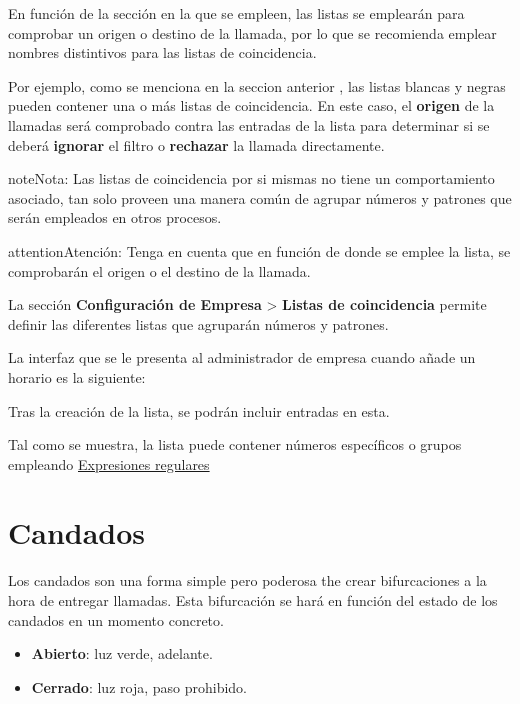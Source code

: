 \documentclass[letterpaper,10pt,spanish]{sphinxmanual}
\begin{document}
En función de la sección en la que se empleen, las listas se emplearán para comprobar un origen o destino de la llamada, por lo que se recomienda emplear nombres distintivos para las listas de coincidencia.

Por ejemplo, como se menciona en la seccion anterior {\hyperref[pbx_features/external_filters:external\string-filters]{}}, las listas blancas y negras pueden contener una o más listas de coincidencia. En este caso, el \textbf{origen} de la llamadas será comprobado contra las entradas de la lista para determinar si se deberá \textbf{ignorar} el filtro o \textbf{rechazar} la llamada directamente.

\begin{notice}{note}{Nota:}
Las listas de coincidencia por si mismas no tiene un comportamiento asociado, tan solo proveen una manera común de agrupar números y patrones que serán empleados en otros procesos.
\end{notice}

\begin{notice}{attention}{Atención:}
Tenga en cuenta que en función de donde se emplee la lista, se comprobarán el origen o el destino de la llamada.
\end{notice}

La sección \textbf{Configuración de Empresa} \textgreater{} \textbf{Listas de coincidencia} permite definir las diferentes listas que agruparán números y patrones.

La interfaz que se le presenta al administrador de empresa cuando añade un horario es la siguiente:


Tras la creación de la lista, se podrán incluir entradas en esta.


Tal como se muestra, la lista puede contener números específicos o grupos empleando \href{http://php.net/manual/en/reference.pcre.pattern.syntax.php}{Expresiones regulares}


\section{Candados}
\label{pbx_features/route_locks:id1}\label{pbx_features/route_locks::doc}\label{pbx_features/route_locks:route-locks}
Los candados son una forma simple pero poderosa the crear bifurcaciones a la hora de entregar llamadas. Esta bifurcación se hará en función del estado de los candados en un momento concreto.
\begin{itemize}
\item {} 
\textbf{Abierto}: luz verde, adelante.

\item {} 
\textbf{Cerrado}: luz roja, paso prohibido.

\end{itemize}
\end{document}
